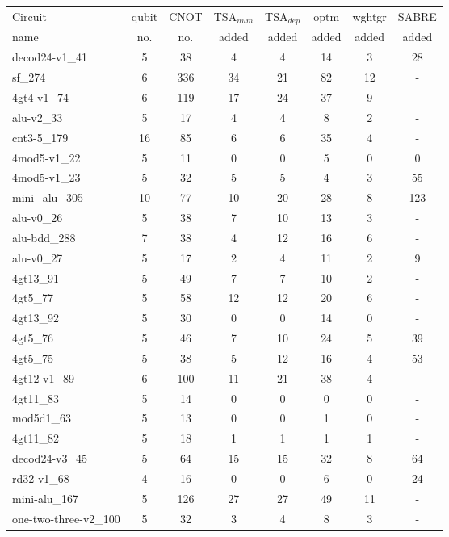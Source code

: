 \documentclass[journal]{IEEEtran}
\begin{document}
    \begin{table*}[htbp]
        \begin{center}  
        \begin{tabular}{|p{4.3cm}<{\centering}|c|c|c|c|c|c|c|}
        \hline
        Circuit &  qubit  & CNOT &TSA$_{num}$& TSA$_{dep}$  & optm 	 & wghtgr  &SABRE 	\\
         name	&   no. 	&	no. & added&  added &  added 	&  added &  added\\
        \hline
decod24-v1\_41 & 5 & 38 & 4 & 4 & 14 & 3& 28 \\
sf\_274 & 6 & 336 & 34 & 21 & 82 & 12& - \\
4gt4-v1\_74 & 6 & 119 & 17 & 24 & 37 & 9& - \\
alu-v2\_33 & 5 & 17 & 4 & 4 & 8 & 2& - \\
cnt3-5\_179 & 16 & 85 & 6 & 6 & 35 & 4& - \\
4mod5-v1\_22 & 5 & 11 & 0 & 0 & 5 & 0&0 \\
4mod5-v1\_23 & 5 & 32 & 5 & 5 & 4 & 3& 55\\
mini\_alu\_305 & 10 & 77 & 10 & 20 & 28 & 8& 123 \\
alu-v0\_26 & 5 & 38 & 7 & 10 & 13 & 3& - \\
alu-bdd\_288 & 7 & 38 & 4 & 12 & 16 & 6& - \\
alu-v0\_27 & 5 & 17 & 2 & 4 & 11 & 2& 9 \\
4gt13\_91 & 5 & 49 & 7 & 7 & 10 & 2& - \\
4gt5\_77 & 5 & 58 & 12 & 12 & 20 & 6& - \\
4gt13\_92 & 5 & 30 & 0 & 0 & 14 & 0& - \\
            4gt5\_76 & 5 & 46 & 7 & 10 & 24 & 5&39 \\
            4gt5\_75 & 5 & 38 & 5 & 12 & 16 & 4& 53 \\
            4gt12-v1\_89 & 6 & 100 & 11 & 21 & 38 & 4& - \\
            4gt11\_83 & 5 & 14 & 0 & 0 & 0 & 0& - \\
            mod5d1\_63 & 5 & 13 & 0 & 0 & 1 & 0& - \\
            4gt11\_82 & 5 & 18 & 1 & 1 & 1 & 1& - \\
            decod24-v3\_45 & 5 & 64 & 15 & 15 & 32 & 8& 64 \\
            rd32-v1\_68 & 4 & 16 & 0 & 0 & 6 & 0& 24 \\
            mini-alu\_167 & 5 & 126 & 27 & 27 & 49 & 11& - \\
            one-two-three-v2\_100 & 5 & 32 & 3 & 4 & 8 & 3& - \\

\end{tabular}
\end{center}
\end{table*}
\end{document}

